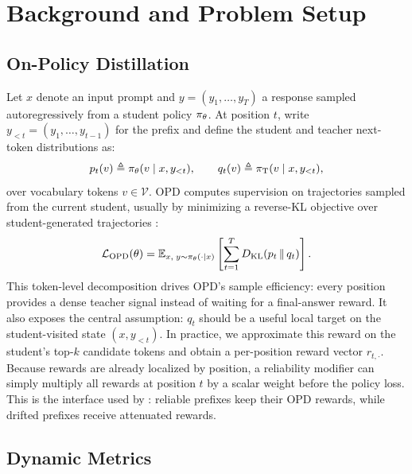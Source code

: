 \section{Background and Problem Setup}

\subsection{On-Policy Distillation}

Let $x$ denote an input prompt and $y=(y_1,\ldots,y_T)$ a response sampled autoregressively from a student policy $\pi_{\theta}$.
At position $t$, write $y_{<t}=(y_1,\ldots,y_{t-1})$ for the prefix and define the student and teacher next-token distributions as:
\begin{equation}
    p_t(v) \triangleq \pi_{\theta}(v\mid x,y_{<t}), \qquad
    q_t(v) \triangleq \pi_{\mathrm{T}}(v\mid x,y_{<t}),
    \label{eq:pt-qt}
\end{equation}
over vocabulary tokens $v\in\mathcal{V}$.
OPD computes supervision on trajectories sampled from the current student, usually by minimizing a reverse-KL objective over student-generated trajectories \citep{gu2024minillm,agarwal2024policy,li2026rethinking}:
\begin{equation}
    \mathcal{L}_{\mathrm{OPD}}(\theta)
    =
    \mathbb{E}_{x,\;y\sim\pi_{\theta}(\cdot\mid x)}
    \left[
        \sum_{t=1}^{T}
        D_{\mathrm{KL}}\!\left(p_t \,\|\, q_t\right)
    \right].
    \label{eq:opd-token-kl}
\end{equation}
This token-level decomposition drives OPD's sample efficiency: every position provides a dense teacher signal instead of waiting for a final-answer reward.
It also exposes the central assumption: $q_t$ should be a useful local target on the student-visited state $(x,y_{<t})$.
In practice, we approximate this reward on the student's top-$k$ candidate tokens and obtain a per-position reward vector $r_{t,\cdot}$.
Because rewards are already localized by position, a reliability modifier can simply multiply all rewards at position $t$ by a scalar weight before the policy loss.
This is the interface used by \method: reliable prefixes keep their OPD rewards, while drifted prefixes receive attenuated rewards.

\subsection{Dynamic Metrics}

